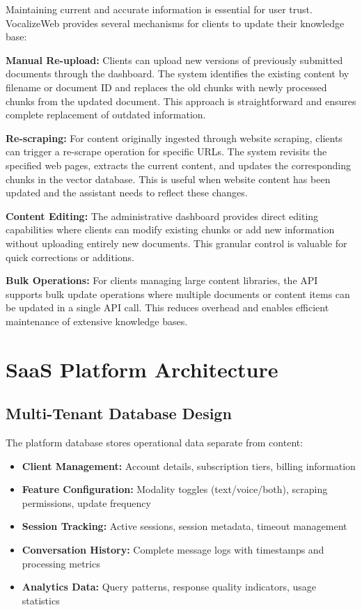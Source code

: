 Maintaining current and accurate information is essential for user trust. VocalizeWeb provides several mechanisms for clients to update their knowledge base:

\textbf{Manual Re-upload:} Clients can upload new versions of previously submitted documents through the dashboard. The system identifies the existing content by filename or document ID and replaces the old chunks with newly processed chunks from the updated document. This approach is straightforward and ensures complete replacement of outdated information.

\textbf{Re-scraping:} For content originally ingested through website scraping, clients can trigger a re-scrape operation for specific URLs. The system revisits the specified web pages, extracts the current content, and updates the corresponding chunks in the vector database. This is useful when website content has been updated and the assistant needs to reflect these changes.

\textbf{Content Editing:} The administrative dashboard provides direct editing capabilities where clients can modify existing chunks or add new information without uploading entirely new documents. This granular control is valuable for quick corrections or additions.

\textbf{Bulk Operations:} For clients managing large content libraries, the API supports bulk update operations where multiple documents or content items can be updated in a single API call. This reduces overhead and enables efficient maintenance of extensive knowledge bases.


\section{SaaS Platform Architecture}

\subsection{Multi-Tenant Database Design}

The platform database stores operational data separate from content:

\begin{itemize}[leftmargin=*]
    \item \textbf{Client Management:} Account details, subscription tiers, billing information
    \item \textbf{Feature Configuration:} Modality toggles (text/voice/both), scraping permissions, update frequency
    \item \textbf{Session Tracking:} Active sessions, session metadata, timeout management
    \item \textbf{Conversation History:} Complete message logs with timestamps and processing metrics
    \item \textbf{Analytics Data:} Query patterns, response quality indicators, usage statistics
\end{itemize}

